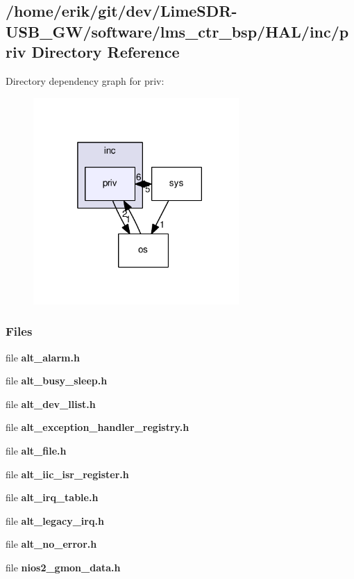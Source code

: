 \subsection{/home/erik/git/dev/\+Lime\+S\+D\+R-\/\+U\+S\+B\+\_\+\+G\+W/software/lms\+\_\+ctr\+\_\+bsp/\+H\+A\+L/inc/priv Directory Reference}
\label{dir_4e679bc0a9fd05f5e0aca19a0e4a8bce}
Directory dependency graph for priv\+:
\nopagebreak
\begin{figure}[H]
\begin{center}
\leavevmode
\includegraphics[width=222pt]{dir_4e679bc0a9fd05f5e0aca19a0e4a8bce_dep}
\end{center}
\end{figure}
\subsubsection*{Files}
\begin{DoxyCompactItemize}
\item 
file {\bf alt\+\_\+alarm.\+h}
\item 
file {\bf alt\+\_\+busy\+\_\+sleep.\+h}
\item 
file {\bf alt\+\_\+dev\+\_\+llist.\+h}
\item 
file {\bf alt\+\_\+exception\+\_\+handler\+\_\+registry.\+h}
\item 
file {\bf alt\+\_\+file.\+h}
\item 
file {\bf alt\+\_\+iic\+\_\+isr\+\_\+register.\+h}
\item 
file {\bf alt\+\_\+irq\+\_\+table.\+h}
\item 
file {\bf alt\+\_\+legacy\+\_\+irq.\+h}
\item 
file {\bf alt\+\_\+no\+\_\+error.\+h}
\item 
file {\bf nios2\+\_\+gmon\+\_\+data.\+h}
\end{DoxyCompactItemize}
